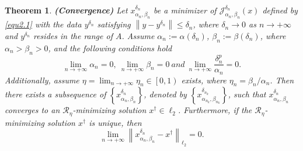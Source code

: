 \documentclass[a4paper,12pt]{article}
\newtheorem{theorem}{Theorem}[section]
\numberwithin{equation}{section}
\begin{document}
\begin{theorem}\label{the3.3}
    \textbf{(Convergence)} Let $x_{\alpha_{n},\beta_{n}}^{\delta_{n}}$ be a minimizer of $\mathcal{J}_{\alpha_{n},\beta_{n}}^{\delta_{n}}\left(x\right)$ defined by \eqref{equ2.1} with the data $y^{\delta_{n}}$ satisfying $\left\|y-y^{\delta_{n}}\right\|\leq\delta_{n}$, where $\delta_{n}\rightarrow 0$ as $n\rightarrow +\infty$ and $y^{\delta_{n}}$ resides in the range of $A$. Assume $\alpha_{n}:=\alpha\left(\delta_{n}\right)$, $\beta_{n}:=\beta\left(\delta_{n}\right)$, where $\alpha_{n}>\beta_{n}> 0$, and the following conditions hold
    \begin{equation*}
        \lim_{n\rightarrow +\infty}\alpha_{n}=0,\ \lim_{n\rightarrow +\infty}\beta_{n}=0\ and\ \lim_{n\rightarrow +\infty}\frac{\delta_{n}^{p}}{\alpha_{n}}=0.
    \end{equation*}
    Additionally, assume $\eta=\lim_{n\rightarrow +\infty}\eta_{n}\in\left[0,1\right)$ exists, where $\eta_{n}=\beta_{n}/\alpha_{n}$. Then there exists a subsequence of $\left\{x_{\alpha_{n},\beta_{n}}^{\delta_{n}}\right\}$, denoted by $\left\{x_{\alpha_{n_{k}},\beta_{n_{k}}}^{\delta_{n_{k}}}\right\}$, such that $x_{\alpha_{n},\beta_{n}}^{\delta_{n}}$ converges to an $\mathcal{R}_{\eta}$-minimizing solution $x^{\dagger}\in\ell_{2}$. Furthermore, if the $\mathcal{R}_{\eta}$-minimizing solution $x^{\dagger}$ is unique, then
    \begin{equation*}
        \lim_{n\rightarrow +\infty}\left\|x_{\alpha_{n},\beta_{n}}^{\delta_{n}}- x^{\dagger}\right\|_{\ell_{2}}=0.
    \end{equation*}
\end{theorem}
\end{document}
